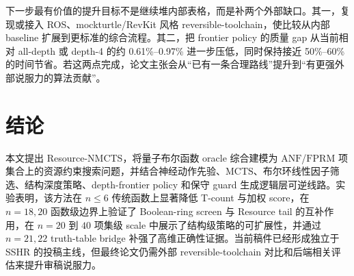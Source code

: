 \documentclass[UTF8,fontset=macnew,11pt]{ctexart}
\newcommand{\method}{Resource-NMCTS}
\newcommand{\screen}{Boolean-ring screen}
\newcommand{\anf}{\ensuremath{\mathrm{ANF}}}
\newcommand{\fprm}{\ensuremath{\mathrm{FPRM}}}
\newcommand{\mcts}{\ensuremath{\mathrm{MCTS}}}
\begin{document}
下一步最有价值的提升目标不是继续堆内部表格，而是补两个外部缺口。其一，复现或接入 ROS、mockturtle/RevKit 风格 reversible-toolchain，使比较从内部 baseline 扩展到更标准的综合流程。其二，把 frontier policy 的质量 gap 从当前相对 all-depth 或 depth-4 的约 0.61\%--0.97\% 进一步压低，同时保持接近 50\%--60\% 的时间节省。若这两点完成，论文主张会从“已有一条合理路线”提升到“有更强外部说服力的算法贡献”。

\section{结论}

本文提出 \method{}，将量子布尔函数 oracle 综合建模为 \anf{}/\fprm{} 项集合上的资源约束搜索问题，并结合神经动作先验、\mcts{}、布尔环线性因子筛选、结构深度策略、depth-frontier policy 和保守 guard 生成逻辑层可逆线路。实验表明，该方法在 $n\leq6$ 传统函数上显著降低 T-count 与加权 score，在 $n=18,20$ 函数级边界上验证了 \screen{} 与 Resource tail 的互补作用，在 $n=20$ 到 $40$ 项集级 scale 中展示了结构级策略的可扩展性，并通过 $n=21,22$ truth-table bridge 补强了高维正确性证据。当前稿件已经形成独立于 SSHR 的投稿主线，但最终论文仍需外部 reversible-toolchain 对比和后端相关评估来提升审稿说服力。
\end{document}
